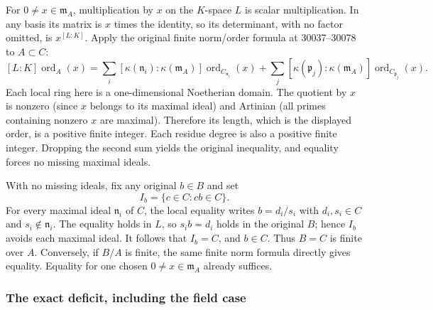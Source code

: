 For \(0\ne x\in\mathfrak m_A\), multiplication by \(x\) on the \(K\)-space \(L\) is scalar multiplication. In any basis its matrix is \(x\) times the identity, so its determinant, with no factor omitted, is \(x^{[L:K]}\). Apply the original finite norm/order formula at 30037--30078 to \(A\subset C\): \[
 [L:K]\operatorname{ord}_A(x)
 =
 \sum_i[\kappa(\mathfrak n_i):\kappa(\mathfrak m_A)]
          \operatorname{ord}_{C_{\mathfrak n_i}}(x)
 +
 \sum_j[\kappa(\mathfrak p_j):\kappa(\mathfrak m_A)]
          \operatorname{ord}_{C_{\mathfrak p_j}}(x).
 \tag{1}
\] Each local ring here is a one-dimensional Noetherian domain. The quotient by \(x\) is nonzero (since \(x\) belongs to its maximal ideal) and Artinian (all primes containing nonzero \(x\) are maximal). Therefore its length, which is the displayed order, is a positive finite integer. Each residue degree is also a positive finite integer. Dropping the second sum yields the original inequality, and equality forces no missing maximal ideals.

With no missing ideals, fix any original \(b\in B\) and set \[
 I_b=\{c\in C:cb\in C\}.
\] For every maximal ideal \(\mathfrak n_i\) of \(C\), the local equality writes \(b=d_i/s_i\) with \(d_i,s_i\in C\) and \(s_i\notin\mathfrak n_i\). The equality holds in \(L\), so \(s_i b=d_i\) holds in the original \(B\); hence \(I_b\) avoids each maximal ideal. It follows that \(I_b=C\), and \(b\in C\). Thus \(B=C\) is finite over \(A\). Conversely, if \(B/A\) is finite, the same finite norm formula directly gives equality. Equality for one chosen \(0\ne x\in\mathfrak m_A\) already suffices.

\subsubsection{The exact deficit, including the field case}\label{algebra-proof-033-the-exact-deficit-including-the-field-case}

